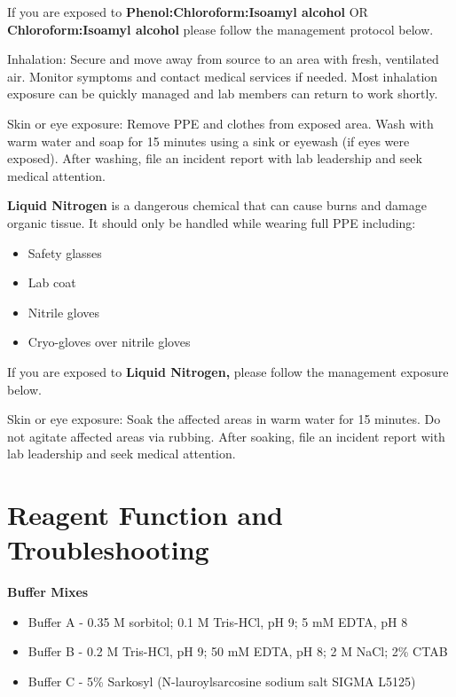 \documentclass[
]{book}
\providecommand{\tightlist}{%
  \setlength{\itemsep}{0pt}\setlength{\parskip}{0pt}}
\begin{document}
If you are exposed to \textbf{Phenol:Chloroform:Isoamyl alcohol} OR \textbf{Chloroform:Isoamyl alcohol} please follow the management protocol below.~

Inhalation: Secure and move away from source to an area with fresh, ventilated air. Monitor symptoms and contact medical services if needed. Most inhalation exposure can be quickly managed and lab members can return to work shortly.~

Skin or eye exposure: Remove PPE and clothes from exposed area. Wash with warm water and soap for 15 minutes using a sink or eyewash (if eyes were exposed). After washing, file an incident report with lab leadership and seek medical attention.~

\textbf{Liquid Nitrogen} is a dangerous chemical that can cause burns and damage organic tissue. It should only be handled while wearing full PPE including:~

\begin{itemize}
\tightlist
\item
  Safety glasses
\item
  Lab coat
\item
  Nitrile gloves
\item
  Cryo-gloves over nitrile gloves
\end{itemize}

If you are exposed to \textbf{Liquid Nitrogen,} please follow the management exposure below.~

Skin or eye exposure: Soak the affected areas in warm water for 15 minutes. Do not agitate affected areas via rubbing. After soaking, file an incident report with lab leadership and seek medical attention.~

\hypertarget{reagent-function-and-troubleshooting}{%
\section{Reagent Function and Troubleshooting~}\label{reagent-function-and-troubleshooting}}

\textbf{Buffer Mixes}~

\begin{itemize}
\item
  Buffer A - 0.35 M sorbitol; 0.1 M Tris-HCl, pH 9; 5 mM EDTA, pH 8~
\item
  Buffer B - 0.2 M Tris-HCl, pH 9; 50 mM EDTA, pH 8; 2 M NaCl; 2\% CTAB~
\item
  Buffer C - 5\% Sarkosyl (N-lauroylsarcosine sodium salt SIGMA L5125)~
\end{itemize}
\end{document}

